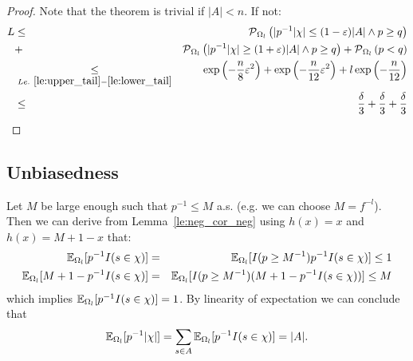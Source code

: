 \begin{proof}
Note that the theorem is trivial if $|A| < n$. If not:
\begin{eqnarray*}
  L & \leq & \operatorname{\mathcal P}_{\Omega_l} \left( | p^{-1} |\chi| \leq (1-\varepsilon) |A| \wedge p \geq q \right)\\
  & + &
    \operatorname{\mathcal P}_{\Omega_l} \left( | p^{-1} |\chi| \geq (1+\varepsilon) |A| \wedge p \geq q \right) +
    \operatorname{\mathcal P}_{\Omega_l} \left( p < q \right) \\
    & \underset{Le.~\ref{le:upper_tail}-\ref{le:lower_tail}}{\leq} &
    \exp\left( - \frac{n}{8} \varepsilon^2 \right)  + \exp\left( - \frac{n}{12} \varepsilon^2 \right) + 
    l \exp\left( - \frac{n}{12} \right) \\
    & \leq & \frac{\delta}{3} + \frac{\delta}{3} + \frac{\delta}{3}
\end{eqnarray*}
\end{proof}
\subsection{Unbiasedness\label{sec:unbiasedness}}
Let $M$ be large enough such that $p^{-1} \leq M$ a.s. (e.g. we can choose $M = f^{-l}$).
Then we can derive from Lemma~\ref{le:neg_cor_neg} using $h(x) = x$ and $h(x) = M+1-x$ that:
\begin{eqnarray*}
  \operatorname{\mathbb E}_{\Omega_l} [ p^{-1} I(s \in \chi) ] & = &
    \operatorname{\mathbb E}_{\Omega_l} [ I(p \geq M^{-1}) p^{-1} I(s \in \chi) ] \leq 1 \\
  \operatorname{\mathbb E}_{\Omega_l} [ M + 1 - p^{-1} I(s \in \chi) ] & = &
    \operatorname{\mathbb E}_{\Omega_l} [ I(p \geq M^{-1}) (M + 1 - p^{-1} I(s \in \chi)) ] \leq M
\end{eqnarray*}
which implies $\operatorname{\mathbb E}_{\Omega_l} [ p^{-1} I(s \in \chi) ] = 1$.
By linearity of expectation we can conclude that
\[
  \operatorname{\mathbb E}_{\Omega_l} [ p^{-1} |\chi| ] =
    \sum_{s \in A} \operatorname{\mathbb E}_{\Omega_l} [ p^{-1} I(s \in \chi) ] = |A| \textrm{.}
\]
